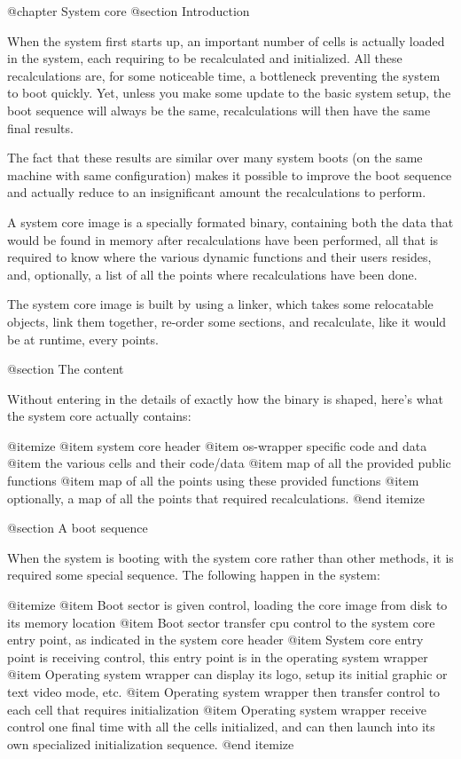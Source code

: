 @chapter System core
@section Introduction

 When the system first starts up, an important number of cells is actually
 loaded in the system, each requiring to be recalculated and initialized.  All
 these recalculations are, for some noticeable time, a bottleneck preventing
 the system to boot quickly.  Yet, unless you make some update to the basic
 system setup, the boot sequence will always be the same, recalculations will
 then have the same final results.

 The fact that these results are similar over many system boots (on the same
 machine with same configuration) makes it possible to improve the boot
 sequence and actually reduce to an insignificant amount the recalculations to
 perform.

 A system core image is a specially formated binary, containing both the data
 that would be found in memory after recalculations have been performed, all
 that is required to know where the various dynamic functions and their users
 resides, and, optionally, a list of all the points where recalculations have
 been done.

 The system core image is built by using a linker, which takes some relocatable
 objects, link them together, re-order some sections, and recalculate, like it
 would be at runtime, every points.

@section The content

 Without entering in the details of exactly how the binary is shaped, here's
 what the system core actually contains:

 @itemize
 @item system core header
 @item os-wrapper specific code and data
 @item the various cells and their code/data
 @item map of all the provided public functions
 @item map of all the points using these provided functions
 @item optionally, a map of all the points that required recalculations.
 @end itemize

@section A boot sequence

 When the system is booting with the system core rather than other methods, it
 is required some special sequence.  The following happen in the system:

 @itemize
 @item Boot sector is given control, loading the core image from disk to its
 memory location
 @item Boot sector transfer cpu control to the system core entry point, as
 indicated in the system core header
 @item System core entry point is receiving control, this entry point is in
 the operating system wrapper
 @item Operating system wrapper can display its logo, setup its initial graphic
 or text video mode, etc.
 @item Operating system wrapper then transfer control to each cell that
 requires initialization
 @item Operating system wrapper receive control one final time with all the
 cells initialized, and can then launch into its own specialized initialization
 sequence.
 @end itemize

